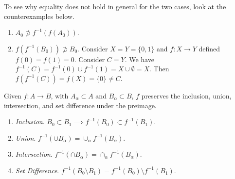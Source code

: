   \begin{example}[Counterexamples]
    \label{ex:counterexamples}
    To see why equality does not hold in general for the two cases, look at the counterexamples below. 
    \begin{enumerate}
      \item $A_0 \not\supset f^{-1} (f(A_0))$. 
      \item $f(f^{-1}(B_0)) \not\supset B_0$. Consider $X = Y = \{0, 1\}$ and $f: X \rightarrow Y$ defined $f(0) = f(1) = 0$. Consider $C = Y$. We have $f^{-1} (C) = f^{-1} (0) \cup f^{-1} (1) = X \cup \emptyset = X$. Then $f(f^{-1} (C)) = f(X) = \{0\} \neq C$. 
    \end{enumerate}
  \end{example}

  \begin{theorem}
    \label{thm:preserve_preimage}
    Given $f: A \rightarrow B$, with $A_\alpha \subset A$ and $B_\alpha \subset B$, $f$ preserves the inclusion, union, intersection, and set difference under the preimage. 
    \begin{enumerate}
      \item \textit{Inclusion}. $B_0 \subset B_1 \implies f^{-1} (B_0) \subset f^{-1} (B_1)$. 
      \item \textit{Union}. $f^{-1} (\cup B_\alpha) = \cup_\alpha f^{-1} (B_\alpha)$. 
      \item \textit{Intersection}. $f^{-1} (\cap B_\alpha) = \cap_\alpha f^{-1} (B_\alpha)$.
      \item \textit{Set Difference}. $f^{-1}(B_0 \setminus B_1) = f^{-1} (B_0) \setminus f^{-1} (B_1)$. 
    \end{enumerate}
  \end{theorem} 
